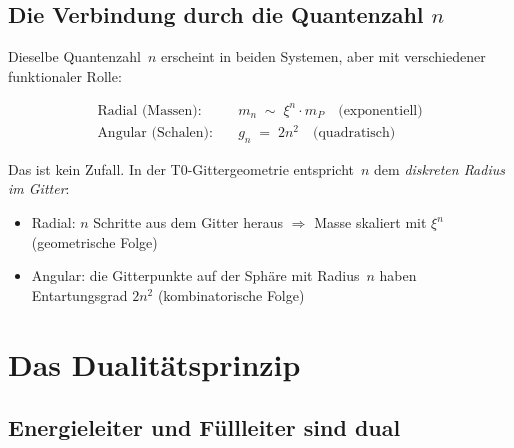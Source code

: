 \begin{table}[htbp]
\centering
\caption{Schalenstruktur und Periodensystem}
\label{tab:schalen}
\end{table}

\subsection{Die Verbindung durch die Quantenzahl \texorpdfstring{$n$}{n}}
\label{subsec:verbindung-n}

Dieselbe Quantenzahl~$n$ erscheint in beiden Systemen, aber mit
verschiedener funktionaler Rolle:

\begin{align}
  \text{Radial (Massen):}  &\quad m_n \;\sim\; \xi^{n} \cdot m_P
    \quad\text{(exponentiell)} \\
  \text{Angular (Schalen):}&\quad g_n \;=\; 2n^2
    \quad\text{(quadratisch)}
\end{align}

Das ist kein Zufall. In der T0-Gittergeometrie entspricht~$n$ dem
\emph{diskreten Radius im Gitter}:
\begin{itemize}
  \item Radial: $n$ Schritte aus dem Gitter heraus $\Rightarrow$
    Masse skaliert mit $\xi^{n}$ (geometrische Folge)
  \item Angular: die Gitterpunkte auf der Sphäre mit Radius~$n$ haben
    Entartungsgrad $2n^2$ (kombinatorische Folge)
\end{itemize}

\section{Das Dualitätsprinzip}
\label{sec:dualitaet}

\subsection{Energieleiter und Füllleiter sind dual}
\label{subsec:dual}

